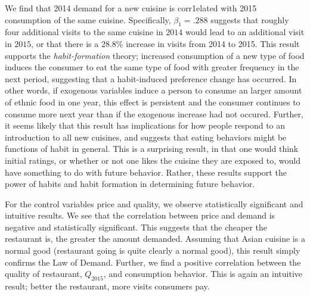 \documentclass[Journal,letterpaper, NoLineNumbers]{ascelike-new}
\begin{document}
We find that 2014 demand for a new cuisine is corr1elated with 2015 consumption of the same cuisine. Specifically, $\beta_1 = .288$ suggests that roughly four additional visits to the same cuisine in $2014$ would lead to an additional visit in $2015$, or that there is a $28.8\%$ increase in visits from 2014 to 2015. This result supports the \textit{habit-formation} theory; increased consumption of a new type of food induces the consumer to eat the same type of food with greater frequency in the next period, suggesting that a habit-induced preference change has occurred. In other words, if exogenous variables induce a person to consume an larger amount of ethnic food in one year, this effect is persistent and the consumer continues to consume more next year than if the exogenous increase had not occured. Further, it seems likely that this result has implications for how people respond to an introduction to all new cuisines, and suggests that eating behaviors might be functions of habit in general. This is a surprising result, in that one would think initial ratings, or whether or not one likes the cuisine they are exposed to, would have something to do with future behavior. Rather, these results support the power of habits and habit formation in determining future behavior.

For the control variables price and quality, we observe statistically significant and intuitive results. We see that the correlation between price and demand is negative and statistically significant. This suggests that the cheaper the restaurant is, the greater the amount demanded. Assuming that Asian cuisine is a normal good (restaurant going is quite clearly a normal good), this result simply confirms the Law of Demand. Further, we find a positive correlation between the quality of restaurant, $Q_{2015}$, and consumption behavior. This is again an intuitive result; better the restaurant, more visits consumers pay. 
\end{document}
